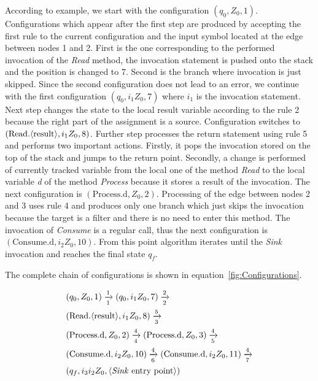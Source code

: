 According to example, we start with the configuration $(q_0, Z_0, 1)$.
Configurations which appear after the first step are produced by accepting the first rule to the current configuration and the input symbol located at the edge between nodes 1 and 2.
First is the one corresponding to the performed invocation of the \textit{Read} method, the invocation statement is pushed onto the stack and the position is changed to 7.
Second is the branch where invocation is just skipped.
Since the second configuration does not lead to an error, we continue with the first configuration $(q_0, i_1 Z_0, 7)$ where $i_1$ is the invocation statement.
Next step changes the state to the local \textlangle{}result\textrangle{} variable according to the rule 2 because the right part of the assignment is a source. Configuration switches to $(\text{Read.\textlangle{}result\textrangle{}}, i_1 Z_0, 8)$.
Further step processes the return statement using rule 5 and performs two important actions.
Firstly, it pops the invocation stored on the top of the stack and jumps to the return point.
Secondly, a change is performed of currently tracked variable from the local one of the method \textit{Read} to the local variable \textit{d} of the method \textit{Process} because it stores a result of the invocation.
The next configuration is $(\text{Process.d}, Z_0, 2)$.
Processing of the edge between nodes 2 and 3 uses rule 4 and produces only one branch which just skips the invocation because the target is a filter and there is no need to enter this method.
The invocation of \textit{Consume} is a regular call, thus the next configuration is $(\text{Consume.d}, i_2 Z_0, 10)$.
From this point algorithm iterates until the \textit{Sink} invocation and reaches the final state $q_f$.

The complete chain of configurations is shown in equation~\ref{fig:Configurations}.

\begin{equation}
    \label{fig:Configurations}
    \begin{split}
        & (q_0, Z_0, 1) \xrightarrow[1]{1} (q_0, i_1 Z_0, 7) \xrightarrow[2]{2} \\
        & (\text{Read.\textlangle{}result\textrangle{}}, i_1 Z_0, 8) \xrightarrow[3]{5} \\
        & (\text{Process.d}, Z_0, 2) \xrightarrow[4]{4} (\text{Process.d}, Z_0, 3) \xrightarrow[5]{4} \\
        & (\text{Consume.d}, i_2 Z_0, 10) \xrightarrow[6]{4} (\text{Consume.d}, i_2 Z_0, 11) \xrightarrow[7]{4} \\
        & (q_f, i_3 i_2 Z_0, \text{\textlangle{}\textit{Sink} entry point\textrangle{}})
    \end{split}
\end{equation}

